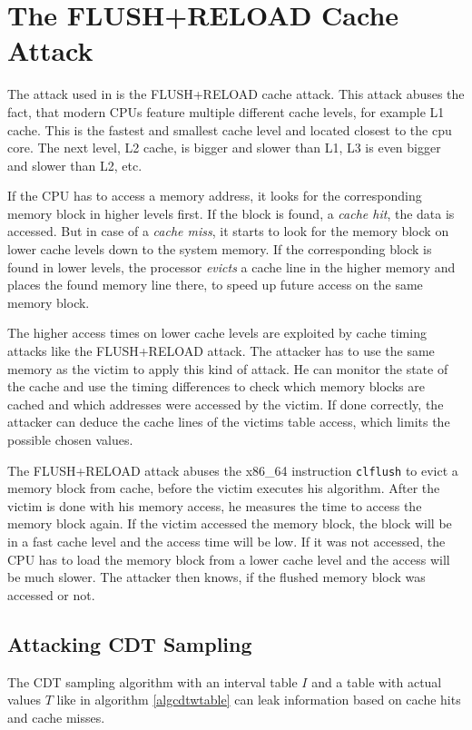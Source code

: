 \section{The FLUSH+RELOAD Cache Attack}
The attack used in \cite{cryptoeprint:2016:300} is the FLUSH+RELOAD cache attack. This attack abuses the fact, that modern CPUs feature multiple different cache levels, for example L1 cache. This is the fastest and smallest cache level and located closest to the cpu core. The next level, L2 cache, is bigger and slower than L1, L3 is even bigger and slower than L2, etc.

If the CPU has to access a memory address, it looks for the corresponding memory block in higher levels first. If the block is found, a \textit{cache hit}, the data is accessed. But in case of a \textit{cache miss}, it starts to look for the memory block on lower cache levels down to the system memory. If the corresponding block is found in lower levels, the processor \textit{evicts} a cache line in the higher memory and places the found memory line there, to speed up future access on the same memory block.

The higher access times on lower cache levels are exploited by cache timing attacks like the FLUSH+RELOAD attack. The attacker has to use the same memory as the victim to apply this kind of attack. He can monitor the state of the cache and use the timing differences to check which memory blocks are cached and which addresses were accessed by the victim. If done correctly, the attacker can deduce the cache lines of the victims table access, which limits the possible chosen values.


The FLUSH+RELOAD attack abuses the x86\_64 instruction \verb|clflush| to evict a memory block from cache, before the victim executes his algorithm. After the victim is done with his memory access, he measures the time to access the memory block again. If the victim accessed the memory block, the block will be in a fast cache level and the access time will be low. If it was not accessed, the CPU has to load the memory block from a lower cache level and the access will be much slower. The attacker then knows, if the flushed memory block was accessed or not.

\subsection{Attacking CDT Sampling}
The CDT sampling algorithm with an interval table $I$ and a table with actual values $T$ like in algorithm \ref{algcdtwtable} can leak information based on cache hits and cache misses.

